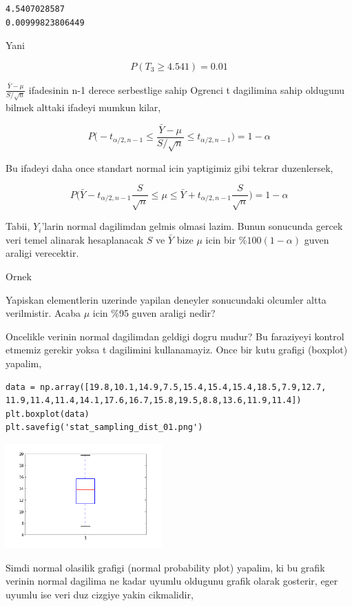 \documentclass[12pt,fleqn]{article}\usepackage{../common}
\begin{document}
\begin{verbatim}
4.5407028587
0.00999823806449
\end{verbatim}

Yani

$$ P(T_3 \ge 4.541) = 0.01 $$

$\frac{\bar{Y}-\mu}{S/\sqrt{n}}$ ifadesinin n-1 derece serbestlige sahip Ogrenci t dagilimina sahip 
oldugunu bilmek alttaki ifadeyi mumkun kilar, 

$$ P \bigg(
-t_{\alpha/2,n-1} \le
\frac{\bar{Y}-\mu}{S/\sqrt{n}} \le 
t_{\alpha/2,n-1}
\bigg) = 1-\alpha
 $$

Bu ifadeyi daha once standart normal icin yaptigimiz gibi tekrar
duzenlersek,

$$ P \bigg(
\bar{Y}-t_{\alpha/2,n-1}\frac{S}{\sqrt{n}} \le
\mu \le 
\bar{Y}+t_{\alpha/2,n-1}\frac{S}{\sqrt{n}}
\bigg) = 1-\alpha
$$

Tabii, $Y_i$'larin normal dagilimdan gelmis olmasi lazim. Bunun sonucunda
gercek veri temel alinarak hesaplanacak $S$ ve $\bar{Y}$ bize $\mu$ icin
bir $\%100(1-\alpha)$ guven araligi verecektir. 

Ornek

Yapiskan elementlerin uzerinde yapilan deneyler sonucundaki olcumler altta
verilmistir. Acaba $\mu$ icin \%95 guven araligi nedir?

Oncelikle verinin normal dagilimdan geldigi dogru mudur? Bu faraziyeyi
kontrol etmemiz gerekir yoksa t dagilimini kullanamayiz. Once bir kutu
grafigi (boxplot) yapalim,

\begin{verbatim}
data = np.array([19.8,10.1,14.9,7.5,15.4,15.4,15.4,18.5,7.9,12.7,
11.9,11.4,11.4,14.1,17.6,16.7,15.8,19.5,8.8,13.6,11.9,11.4])
plt.boxplot(data)
plt.savefig('stat_sampling_dist_01.png')
\end{verbatim}

\includegraphics[height=4cm]{stat_sampling_dist_01.png}

Simdi normal olasilik grafigi (normal probability plot) yapalim, ki bu
grafik verinin normal dagilima ne kadar uyumlu oldugunu grafik olarak
gosterir, eger uyumlu ise veri duz cizgiye yakin cikmalidir,
\end{document}
